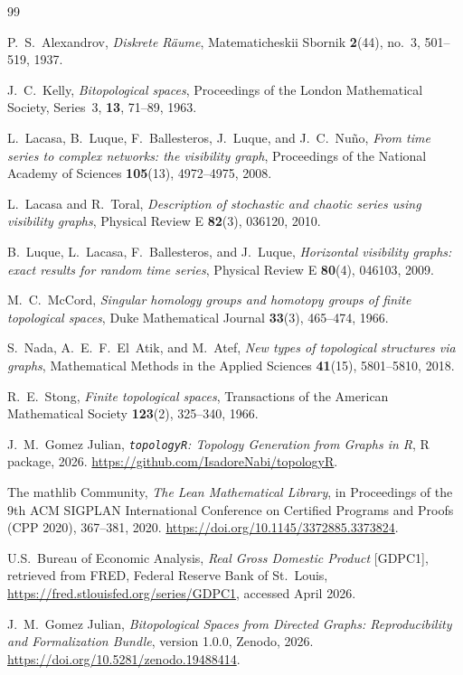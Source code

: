 \documentclass[11pt,a4paper]{article}
\theoremstyle{plain}
\theoremstyle{definition}
\begin{document}
\begin{thebibliography}{99}

P.~S.~Alexandrov,
\emph{Diskrete R\"aume},
Matematicheskii Sbornik \textbf{2}(44), no.~3, 501--519, 1937.

J.~C.~Kelly,
\emph{Bitopological spaces},
Proceedings of the London Mathematical Society, Series~3, \textbf{13},
71--89, 1963.

L.~Lacasa, B.~Luque, F.~Ballesteros, J.~Luque, and J.~C.~Nu\~no,
\emph{From time series to complex networks: the visibility graph},
Proceedings of the National Academy of Sciences \textbf{105}(13),
4972--4975, 2008.

L.~Lacasa and R.~Toral,
\emph{Description of stochastic and chaotic series using visibility graphs},
Physical Review E \textbf{82}(3), 036120, 2010.

B.~Luque, L.~Lacasa, F.~Ballesteros, and J.~Luque,
\emph{Horizontal visibility graphs: exact results for random time series},
Physical Review E \textbf{80}(4), 046103, 2009.

M.~C.~McCord,
\emph{Singular homology groups and homotopy groups of finite topological spaces},
Duke Mathematical Journal \textbf{33}(3), 465--474, 1966.

S.~Nada, A.~E.~F.~El~Atik, and M.~Atef,
\emph{New types of topological structures via graphs},
Mathematical Methods in the Applied Sciences \textbf{41}(15), 5801--5810,
2018.

R.~E.~Stong,
\emph{Finite topological spaces},
Transactions of the American Mathematical Society \textbf{123}(2),
325--340, 1966.

J.~M.~Gomez Julian,
\emph{\texttt{topologyR}: Topology Generation from Graphs in R},
R package, 2026.
\url{https://github.com/IsadoreNabi/topologyR}.

The mathlib Community,
\emph{The Lean Mathematical Library},
in Proceedings of the 9th ACM SIGPLAN International Conference on
Certified Programs and Proofs (CPP 2020), 367--381, 2020.
\url{https://doi.org/10.1145/3372885.3373824}.

U.S.~Bureau of Economic Analysis,
\emph{Real Gross Domestic Product} [GDPC1],
retrieved from FRED, Federal Reserve Bank of St.~Louis,
\url{https://fred.stlouisfed.org/series/GDPC1}, accessed April 2026.

J.~M.~Gomez Julian,
\emph{Bitopological Spaces from Directed Graphs: Reproducibility and
Formalization Bundle}, version 1.0.0, Zenodo, 2026.
\url{https://doi.org/10.5281/zenodo.19488414}.

\end{thebibliography}
\end{document}
